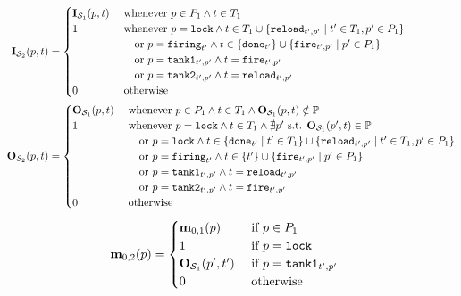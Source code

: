 \begin{align*}
  \inm[\namePPN[2]][p,t] &= \begin{cases}
      \inm[\namePPN[1]][p,t] &\text{ whenever } p \in \places_1 \wedge t \in \transitions_1 \\
      1 &\text{ whenever } p = \mathtt{lock}
          \wedge t \in \transitions_1 \cup \setComp{ \mathtt{reload}_{t',p'}}{t' \in \transitions_1, p' \in \places_1}\\
        &\quad\text{ or } p = \mathtt{firing}_{t'}
          \wedge t \in \{\mathtt{done}_{t'}\} \cup \setComp{\mathtt{fire}_{t',p'}}{p' \in \places_1} \\
        &\quad\text{ or } p = \mathtt{tank1}_{t',p'} \wedge t = \mathtt{fire}_{t',p'} \\
        &\quad\text{ or } p = \mathtt{tank2}_{t',p'} \wedge t = \mathtt{reload}_{t',p'} \\
      0 &\text{ otherwise }
    \end{cases} \\
  \outm[\namePPN[2]][p,t] &= \begin{cases}
      \outm[\namePPN[1]][p,t] &\text{ whenever } p \in \places_1 \wedge t \in \transitions_1 \wedge \outm[\namePPN[1]][p,t] \notin \parameters \\
      1 &\text{ whenever } p = \mathtt{lock}
          \wedge t \in \transitions_1 \wedge \nexists p' \text{ s.t. } \outm[\namePPN[1]][p',t] \in \parameters \\
        &\quad\text{ or } p = \mathtt{lock}
          \wedge t \in \setComp{\mathtt{done}_{t'}}{t' \in \transitions_1} \cup \setComp{\mathtt{reload}_{t',p'}}{t' \in \transitions_1, p' \in \places_1} \\
        &\quad\text{ or } p = \mathtt{firing}_{t'}
          \wedge t \in \{t'\} \cup \setComp{\mathtt{fire}_{t',p'}}{p' \in \places_1} \\
        &\quad\text{ or } p = \mathtt{tank1}_{t',p'} \wedge t = \mathtt{reload}_{t',p'} \\
        &\quad\text{ or } p = \mathtt{tank2}_{t',p'} \wedge t = \mathtt{fire}_{t',p'} \\
      0 &\text{ otherwise }
    \end{cases}
\end{align*}
\begin{align*}
  \mar_{0,2}(p) &= \begin{cases}
      \mar_{0,1}(p)             &\text{ if } p \in \places_1 \\
      1                         &\text{ if } p = \mathtt{lock} \\
      \outm[\namePPN[1]][p',t'] &\text{ if } p = \mathtt{tank1}_{t',p'} \\
      0                         &\text{ otherwise }
    \end{cases}
\end{align*}

